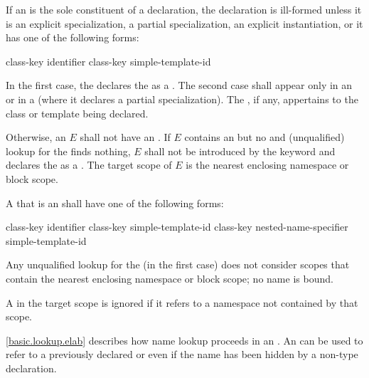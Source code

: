 \pnum
{}%
%
If an  is the sole constituent of a
declaration, the declaration is ill-formed unless it is an explicit
specialization,
a partial specialization,
an explicit
instantiation, or it has one of the following
forms:

\begin{ncsimplebnf}
class-key  identifier \terminal{;}\br
class-key  simple-template-id \terminal{;}
\end{ncsimplebnf}

In the first case,
the  declares
the  as a .
The second case shall appear only
in an  or
in a 
(where it declares a partial specialization).
The , if any, appertains
to the class or template being declared.

\pnum
Otherwise, an  $E$ shall not have
an .
If $E$ contains an 
but no  and
(unqualified) lookup for the  finds nothing,
$E$ shall not be introduced by the  keyword and
declares the  as a .
The target scope of $E$ is the nearest enclosing namespace or block scope.

\pnum
A 
that is an 
shall have one of the following forms:
\begin{ncsimplebnf}
class-key  identifier\br
class-key simple-template-id\br
class-key nested-name-specifier  simple-template-id
\end{ncsimplebnf}
Any unqualified lookup for the  (in the first case)
does not consider scopes that contain
the nearest enclosing namespace or block scope; no name is bound.
\begin{note}
A  in the target scope is ignored
if it refers to a namespace not contained by that scope.
\end{note}

\pnum
\begin{note}
\ref{basic.lookup.elab} describes how name lookup proceeds
in an .
An  can be used to refer to
a previously declared  or 
even if the name has been hidden by a non-type declaration.
\end{note}

